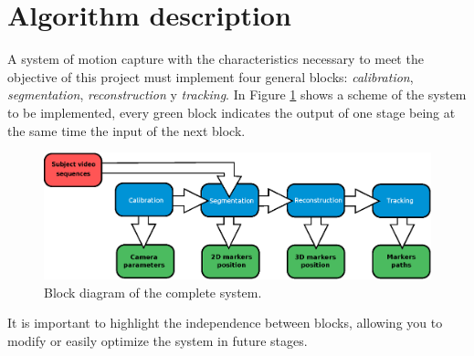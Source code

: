 \section{Algorithm description}\label{implementacion}
A system of motion capture with the characteristics necessary to meet the objective of this project must implement four general blocks: 
\emph{calibration}, \emph{segmentation}, \emph{reconstruction} y \emph{tracking}. In Figure \ref{bloquesSist} shows a scheme of the system to be implemented, every green block indicates the output of one stage being at the same time the input of the next block.
\begin{figure}[ht!]
\centering
\hspace{-0.5cm}
\includegraphics[scale=0.4]{imagenes/Sistema_completo/Diagrama_de_bloques.eps}
\caption{Block diagram of the complete system.}
\label{bloquesSist}
\end{figure}

It is important to highlight the independence between blocks, allowing you to modify or easily optimize the system in future stages.


